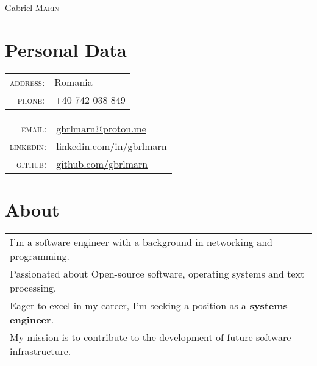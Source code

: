\documentclass[a4paper,10pt]{article}
\begin{document}
\pagestyle{empty}

\par
  {\centering
    {\Huge Gabriel \textsc{Marin}}
    \bigskip\par
  }

\section{Personal Data}
\begin{multicols}{2}
  \begin{tabular}{rl}
    \textsc{address:}&Romania\\
    \textsc{phone:}&+40 742 038 849\\
  \end{tabular}
    \columnbreak
  \begin{tabular}{rl}
    \textsc{email:}&\href{mailto:gbrlmarn@proton.me}
      {gbrlmarn@proton.me}\\
    \textsc{linkedin:}&\href{https://linkedin.com/in/gbrlmarn}
      {linkedin.com/in/gbrlmarn}\\
    \textsc{github:}&\href{https://github.com/gbrlmarn}
      {github.com/gbrlmarn}\\
  \end{tabular}
\end{multicols}

\section{About}
\begin{tabular}{l}
I'm a software engineer with a background in networking and programming.\\
Passionated about Open-source software, operating systems and text processing.\\
Eager to excel in my career, I'm seeking a position as a \textbf{systems engineer}.\\ 
My mission is to contribute to the development of future software infrastructure.\\
\end{tabular}

\end{document}
